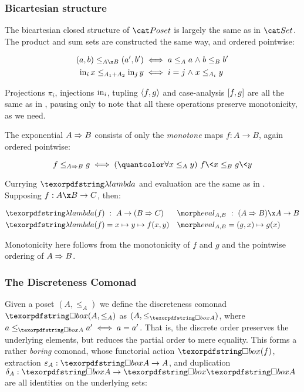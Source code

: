 

\subsubsection{Bicartesian structure}

The bicartesian closed structure of $\Poset$ is largely the same as in $\Set$.
%
The product and sum sets are constructed the same way, and ordered pointwise:

\begin{align*}
  (a,b) \le_{A \x B} (a',b') &\iff a \le_A a \wedge b \le_B b'\\
  \inj i x \le_{A_1 + A_2} \inj j y &\iff i = j \wedge x \le_{A_i} y
\end{align*}

\noindent Projections $\pi_i$, injections $\mathrm{in}_i$, tupling $\langle{f,g}\rangle$ and
case-analysis $[{f,g}]$ are all the same as in \Set, pausing only to note
that all these operations preserve monotonicity, as we need.

The exponential $A \Rightarrow B$ consists of only the \emph{monotone} maps $f : A \to
B$, again ordered pointwise:

\[ f \le_{\expO A B} g \iff \fa{x \le_A y} f\<x \le_B g\<y \]

\noindent
Currying $\fn$ and evaluation are the same as in \Set. Supposing $f : A \x B \to
C$, then:

\begin{align*}
  \fn(f) &\isa A \to (\expO B C) &
  \eval_{A,B} &\isa (\expO A B) \x A \to B
  \\
  \fn(f) &= x \mapsto y \mapsto f(x,y) &
  \eval_{A,B} &= (g,x) \mapsto g(x)
\end{align*}

\noindent
Monotonicity here follows from the monotonicity of $f$ and $g$ and the pointwise ordering of $A \Rightarrow B$.


\subsubsection{The Discreteness Comonad}

Given a poset $(A, \leq_A)$ we define the discreteness comonad $\iso(A, \leq_A)$
as $(A, \leq_{\iso A})$, where \( a \leq_{\iso A} a' \iff a = a' \).
%
That is, the discrete order preserves the underlying elements, but reduces the
partial order to mere equality.
%
This forms a rather \emph{boring} comonad, whose functorial action $\iso(f)$, extraction $\varepsilon_A : \iso A \to A$, and duplication $\delta_A : \iso A \to \iso \iso A$ are all identities on the underlying sets:

